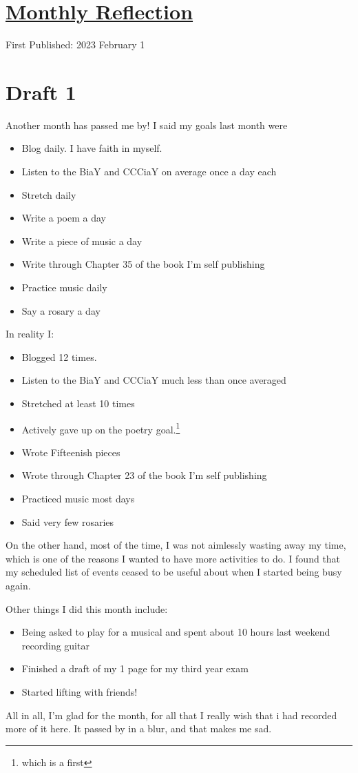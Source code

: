 \documentclass[12pt]{article}[titlepage]
\renewcommand{\,}{\textsuperscript{,}}
\begin{document}
\doublespacing
\section{\href{reflection-january-23.html}{Monthly Reflection}}
First Published: 2023 February 1

\section{Draft 1}
Another month has passed me by!
I said my goals last month were
\begin{itemize}
\item Blog daily. I have faith in myself.
\item Listen to the BiaY and CCCiaY on average once a day each
\item Stretch daily
\item Write a poem a day
\item Write a piece of music a day
\item Write through Chapter 35 of the book I'm self publishing
\item Practice music daily
\item Say a rosary a day
\end{itemize}

In reality I:
\begin{itemize}
\item Blogged 12 times.
\item Listen to the BiaY and CCCiaY much less than once averaged
\item Stretched at least 10 times
\item Actively gave up on the poetry goal.\footnote{which is a first}
\item Wrote Fifteenish pieces
\item Wrote through Chapter 23 of the book I'm self publishing
\item Practiced music most days
\item Said very few rosaries
\end{itemize}

On the other hand, most of the time, I was not aimlessly wasting away my time, which is one of the reasons I wanted to have more activities to do.
I found that my scheduled list of events ceased to be useful about when I started being busy again.

Other things I did this month include:
\begin{itemize}
\item Being asked to play for a musical and spent about 10 hours last weekend recording guitar
\item Finished a draft of my 1 page for my third year exam
\item Started lifting with friends!
\end{itemize}

All in all, I'm glad for the month, for all that I really wish that i had recorded more of it here.
It passed by in a blur, and that makes me sad.
\end{document}
